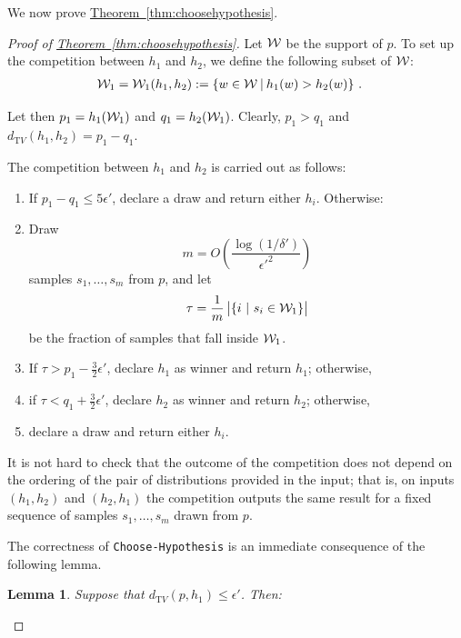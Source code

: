 \documentclass[10pt]{article}
\newtheorem{lemma}[theorem]{Lemma}
\theoremstyle{definition}
\numberwithin{equation}{section}
\newcommand{\expref}[2]{\texorpdfstring{\hyperref[#2]{#1~\ref{#2}}}{#1~\ref{#2}}}
\newcommand{\algorithml}[1]{{\normalfont\texttt{#1}}}
\newcommand{\dtv}{d_{\mathrm TV}}
\newcommand{\eps}{\epsilon}
\begin{document}
We now prove \expref{Theorem}{thm:choosehypothesis}.

\begin{proof}[Proof of \expref{Theorem}{thm:choosehypothesis}]
Let ${\cal W}$ be the support of $p$. To set up the competition between $h_1$ and $h_2$, we define the following subset of ${\cal W}$:
\begin{align}
&{\cal W}_1={\cal W}_1(h_1,h_2) := \left\{w \in \mathcal{W}~\vline~h_1(w) > h_2(w) \right\}\,. \label{eq:W1}
%
%
\end{align}

\noindent Let then $p_1 = h_1({\cal W}_1)$ and $q_1 = h_2({\cal W}_1)$. Clearly, $p_1 > q_1$ and
 $\dtv(h_1, h_2) = p_1-q_1$.

%

The competition between $h_1$ and $h_2$ is carried out as follows:

\begin{enumerate}
\item  If $p_1-q_1\leq 5 \eps'$, declare a draw and return either $h_i$. Otherwise:

\item  Draw 
  \[
  m=O\left(\frac{\log(1/\delta')}{\eps'^2}\right)
  \]
  samples $s_1,\ldots,s_m$ from $p$, and let 
  \[
  \tau = \frac{1}{m}\, \bigl| \{i~|~s_i \in {\cal W}_1 \}\bigr|
  \]
  be the fraction of  samples that fall inside ${\cal W}_1$.


\item  If $\tau > p_1- \frac{3}{2} \eps'$, declare $h_1$ as winner and return $h_1$; otherwise,

\item  if $\tau < q_1+ \frac{3}{2} \eps'$, declare $h_2$ as winner and return $h_2$; otherwise,

\item  declare a draw and return either $h_i$.

\end{enumerate}

It is not hard to check that the outcome of the competition does not depend on the ordering of the pair of distributions provided in the input; that is, on inputs $(h_1,h_2)$ and $(h_2,h_1)$ the competition outputs the same result for a fixed sequence of samples $s_1,\ldots,s_m$ drawn from $p$.

The correctness of \algorithml{Choose-Hypothesis} is an immediate consequence of the following lemma.

%

\begin{lemma} \label{lem:kostas3}
Suppose that $\dtv(p,h_1) \leq \eps'$. Then:
\begin{itemize}


\end{itemize}
\end{lemma}
\end{proof}
\end{document}
